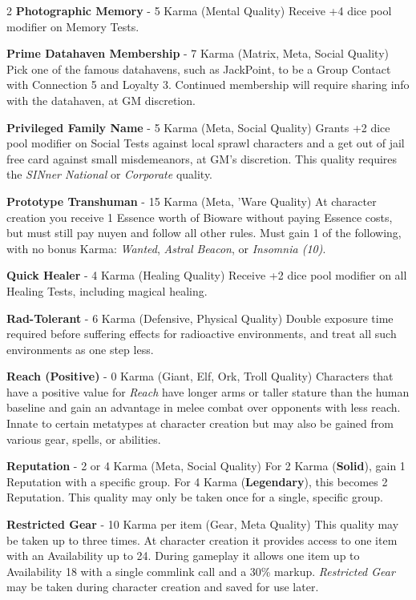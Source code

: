 \documentclass[
  oneside]{article}
\begin{document}
\begin{multicols}{2}
\textbf{Photographic Memory} - 5 Karma (Mental
Quality) Receive +4 dice pool modifier on Memory
Tests.

\textbf{Prime Datahaven Membership} - 7 Karma
(Matrix, Meta, Social Quality) Pick one of the
famous datahavens, such as JackPoint, to be a
Group Contact with Connection 5 and Loyalty 3.
Continued membership will require sharing info
with the datahaven, at GM discretion.

\textbf{Privileged Family Name} - 5 Karma (Meta,
Social Quality) Grants +2 dice pool modifier on
Social Tests against local sprawl characters and a
get out of jail free card against small
misdemeanors, at GM's discretion. This quality
requires the \emph{SINner National} or
\emph{Corporate} quality.

\textbf{Prototype Transhuman} - 15 Karma (Meta,
'Ware Quality) At character creation you receive 1
Essence worth of Bioware without paying Essence
costs, but must still pay nuyen and follow all
other rules. Must gain 1 of the following, with no
bonus Karma: \emph{Wanted}, \emph{Astral Beacon},
or \emph{Insomnia (10)}.

\textbf{Quick Healer} - 4 Karma (Healing Quality)
Receive +2 dice pool modifier on all Healing
Tests, including magical healing.

\textbf{Rad-Tolerant} - 6 Karma (Defensive,
Physical Quality) Double exposure time required
before suffering effects for radioactive
environments, and treat all such environments as
one step less.

\textbf{Reach (Positive)} - 0 Karma (Giant, Elf,
Ork, Troll Quality) Characters that have a
positive value for \emph{Reach} have longer arms
or taller stature than the human baseline and gain
an advantage in melee combat over opponents with
less reach. Innate to certain metatypes at
character creation but may also be gained from
various gear, spells, or abilities.

\textbf{Reputation} - 2 or 4 Karma (Meta, Social
Quality) For 2 Karma (\textbf{Solid}), gain 1
Reputation with a specific group. For 4 Karma
(\textbf{Legendary}), this becomes 2 Reputation.
This quality may only be taken once for a single,
specific group.

\textbf{Restricted Gear} - 10 Karma per item
(Gear, Meta Quality) This quality may be taken up
to three times. At character creation it provides
access to one item with an Availability up to 24.
During gameplay it allows one item up to
Availability 18 with a single commlink call and a
30\% markup. \emph{Restricted Gear} may be taken
during character creation and saved for use later.


\end{multicols}
\end{document}
